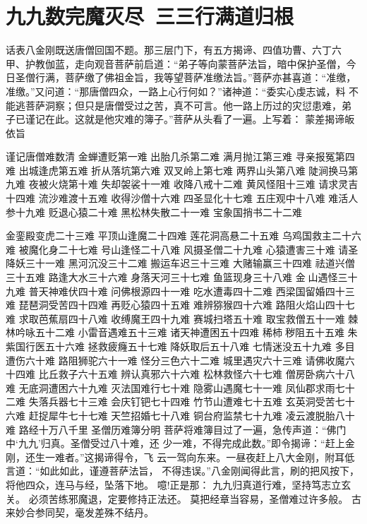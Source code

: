 \chapter{九九数完魔灭尽~三三行满道归根}

话表八金刚既送唐僧回国不题。那三层门下，有五方揭谛、四值功曹、六丁六
甲、护教伽蓝，走向观音菩萨前启道：“弟子等向蒙菩萨法旨，暗中保护圣僧，今
日圣僧行满，菩萨缴了佛祖金旨，我等望菩萨准缴法旨。”菩萨亦甚喜道：“准缴，
准缴。”又问道：“那唐僧四众，一路上心行何如？”诸神道：“委实心虔志诚，料
不能逃菩萨洞察；但只是唐僧受过之苦，真不可言。他一路上历过的灾愆患难，弟
子已谨记在此。这就是他灾难的簿子。”菩萨从头看了一遍。上写着：
蒙差揭谛皈依旨

谨记唐僧难数清
金蝉遭贬第一难
出胎几杀第二难
满月抛江第三难
寻亲报冤第四难
出城逢虎第五难
折从落坑第六难
双叉岭上第七难
两界山头第八难
陡涧换马第九难
夜被火烧第十难
失却袈裟十一难
收降八戒十二难
黄风怪阻十三难
请求灵吉十四难
流沙难渡十五难
收得沙僧十六难
四圣显化十七难
五庄观中十八难
难活人参十九难
贬退心猿二十难
黑松林失散二十一难
宝象国捎书二十二难

金銮殿变虎二十三难
平顶山逢魔二十四难
莲花洞高悬二十五难
乌鸡国救主二十六难
被魔化身二十七难
号山逢怪二十八难
风摄圣僧二十九难
心猿遭害三十难
请圣降妖三十一难
黑河沉没三十二难
搬运车迟三十三难
大赌输赢三十四难
祛道兴僧三十五难
路逢大水三十六难
身落天河三十七难
鱼篮现身三十八难
金山遇怪三十九难
普天神难伏四十难
问佛根源四十一难
吃水遭毒四十二难
西梁国留婚四十三难
琵琶洞受苦四十四难
再贬心猿四十五难
难辨猕猴四十六难
路阻火焰山四十七难
求取芭蕉扇四十八难
收缚魔王四十九难
赛城扫塔五十难
取宝救僧五十一难
棘林吟咏五十二难
小雷音遇难五十三难
诸天神遭困五十四难
稀柿秽阻五十五难
朱紫国行医五十六难
拯救疲癃五十七难
降妖取后五十八难
七情迷没五十九难
多目遭伤六十难
路阻狮驼六十一难
怪分三色六十二难
城里遇灾六十三难
请佛收魔六十四难
比丘救子六十五难
辨认真邪六十六难
松林救怪六十七难
僧房卧病六十八难
无底洞遭困六十九难
灭法国难行七十难
隐雾山遇魔七十一难
凤仙郡求雨七十二难
失落兵器七十三难
会庆钉钯七十四难
竹节山遭难七十五难
玄英洞受苦七十六难
赶捉犀牛七十七难
天竺招婚七十八难
铜台府监禁七十九难
凌云渡脱胎八十难
路经十万八千里
圣僧历难簿分明
菩萨将难簿目过了一遍，急传声道：“佛门中‘九九’归真。圣僧受过八十难，还
少一难，不得完成此数。”即令揭谛：“赶上金刚，还生一难者。”这揭谛得令，飞
云一驾向东来。一昼夜赶上八大金刚，附耳低言道：“如此如此，谨遵菩萨法旨，
不得违误。”八金刚闻得此言，刷的把风按下，将他四众，连马与经，坠落下地。
噫!正是那：
九九归真道行难，坚持笃志立玄关。
必须苦练邪魔退，定要修持正法还。
莫把经章当容易，圣僧难过许多般。
古来妙合参同契，毫发差殊不结丹。

